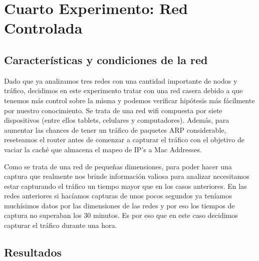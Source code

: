 \documentclass{article}
\theoremstyle{definition}
\theoremstyle{remark}
\begin{document}
\newpage
\section{Cuarto Experimento: Red Controlada}
\subsection{Características y condiciones de la red}
Dado que ya analizamos tres redes con una cantidad importante de nodos y tráfico, decidimos en este experimento tratar con una red casera debido a que tenemos más control sobre la misma y podemos verificar hipótesis más fácilmente por nuestro conocimiento. Se trata de una red wifi compuesta por siete dispositivos (entre ellos tablets, celulares y computadores). Además, para aumentar las chances de tener un tráfico de paquetes ARP considerable, reseteamos el router antes de comenzar a capturar el tráfico con el objetivo de vaciar la caché que almacena el mapeo de IP's a Mac Addresses.
\par Como se trata de una red de pequeñas dimensiones, para poder hacer una captura que realmente nos brinde información valiosa para analizar necesitamos estar capturando el tráfico un tiempo mayor que en los casos anteriores. En las redes anteriores si hacíamos capturas de unos pocos segundos ya teníamos muchísimos datos por las dimensiones de las redes y por eso los tiempos de captura no superaban los 30 minutos. Es por eso que en este caso decidimos capturar el tráfico durante una hora.
\subsection{Resultados}
\end{document}
